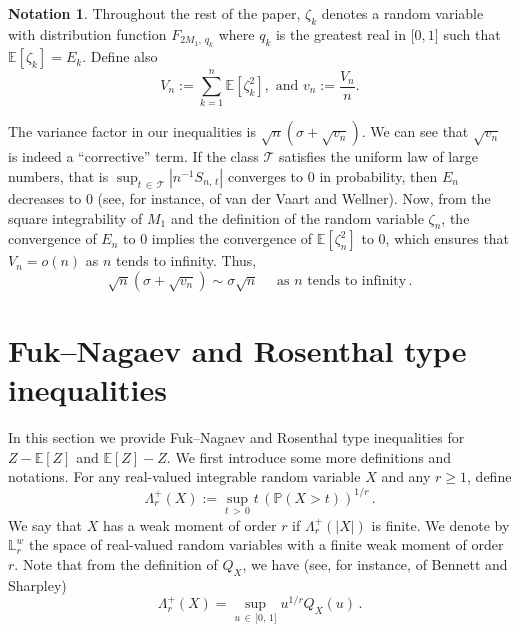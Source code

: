 \documentclass[10pt]{amsart}
\theoremstyle{definition}\newtheorem{defi}[theo]{Definition}\newtheorem{rema}[theo]{Remark}\newtheorem{exam}[theo]{Example}\newtheorem{exem}[theo]{Example}\newtheorem{nota}[theo]{Notation}
\newcommand{\bE}{\mathbb{E}}
\newcommand{\bL}{\mathbb{L}}
\newcommand{\bP}{\mathbb{P}}
\newcommand{\cT}{\mathcal{T}}
\newcommand{\intervalleff}[2]{\mathopen{[} #1\mathclose{}\mathpunct{},#2\mathclose{]}}
\begin{document}
\begin{nota}
Throughout the rest of the paper, $\zeta_k$ denotes a random variable with distribution function $F_{2M_1,\,q_k}$ where $q_k$ is the greatest real in $\intervalleff 01$ such that $\bE[\zeta_k]=E_k$. Define also
\begin{equation}\label{def:V_n}
V_n:=\sum_{k=1}^n \bE\left[\zeta_k^2\right],\text{ and } v_n:=\frac{V_n}{n}.
\end{equation}
\end{nota}

The variance factor in our inequalities is $\sqrt n(\sigma+\sqrt{v_n})$. We can see that $\sqrt{v_n}$ is indeed a ``corrective'' term. If the class $\cT$ satisfies the uniform law of large numbers, that is $\sup_{t\,\in\,\cT}|n^{-1}S_{n,\,t}|$ converges to $0$ in probability, then $E_n$ decreases to 0 (see, for instance, \cite[Section~2.4]{vdVW96} of van der Vaart and Wellner). Now, from the square integrability of $M_1$ and the definition of the random variable $\zeta_n$, the convergence of $E_n$ to $0$ implies the convergence of $\bE[\zeta_n^2]$ to 0, which ensures that $V_n=o(n)$ as $n$ tends to infinity. Thus,
\begin{equation}
\sqrt n(\sigma+\sqrt{v_n})\sim\sigma\sqrt n\quad\text{ as $n$ tends to infinity}\,.
\end{equation}

\section{Fuk--Nagaev and Rosenthal type inequalities}\label{section:FukNagaev Rosenthal}
In this section we provide Fuk--Nagaev and Rosenthal type inequalities for $Z-\bE[Z]$ and $\bE[Z]-Z$. We first introduce some more definitions and notations. For any real-valued integrable random variable $X$ and any $r\geq 1$, define
\begin{equation}\label{eqn:def weak norm}
\Lambda_r^+(X):=\sup_{t\,>\,0} t\,(\bP(X>t))^{1/r}\,.
\end{equation}
We say that $X$ has a weak moment of order $r$ if $\Lambda_r^+(|X|)$ is finite. We denote by $\bL_r^w$ the space of real-valued random variables with a finite weak moment of order $r$. Note that from the definition of $Q_X$, we have (see, for instance, \cite[Chapter~4]{BS88} of Bennett and Sharpley)
\begin{equation}
\Lambda_r^+(X)=\sup_{u\,\in\,]0,\,1]}u^{1/r}Q_X(u)\,.
\end{equation}
\end{document}
